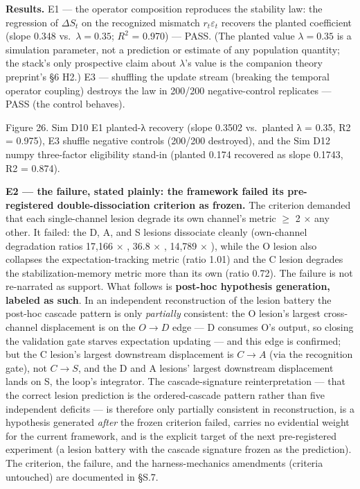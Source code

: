 \documentclass[
]{article}
\begin{document}
\textbf{Results.} E1 --- the operator composition reproduces the
stability law: the regression of \(\Delta S_t\) on the recognized
mismatch \(r_t\varepsilon_t\) recovers the planted coefficient (slope
0.348 vs.~\(\lambda = 0.35\); \(R^{2}\) = 0.970) --- PASS. (The planted
value \(\lambda = 0.35\) is a simulation parameter, not a prediction or
estimate of any population quantity; the stack's only prospective claim
about \(\lambda\)'s value is the companion theory preprint's §6 H2.) E3
--- shuffling the update stream (breaking the temporal operator
coupling) destroys the law in 200/200 negative-control replicates ---
PASS (the control behaves).

Figure 26. Sim D10 E1 planted-{λ} recovery (slope 0.3502 vs.~planted
{λ = 0.35}, {R2 = 0.975}), E3 shuffle negative controls (200/200
destroyed), and the Sim D12 numpy three-factor eligibility stand-in
(planted 0.174 recovered as slope 0.1743, {R2 = 0.874}).

\textbf{E2 --- the failure, stated plainly: the framework failed its
pre-registered double-dissociation criterion as frozen.} The criterion
demanded that each single-channel lesion degrade its own channel's
metric \(\geq\) 2 \(\times\) any other. It failed: the D, A, and S
lesions dissociate cleanly (own-channel degradation ratios 17,166
\(\times\) , 36.8 \(\times\) , 14,789 \(\times\) ), while the O lesion
also collapses the expectation-tracking metric (ratio 1.01) and the C
lesion degrades the stabilization-memory metric more than its own (ratio
0.72). The failure is not re-narrated as support. What follows is
\textbf{post-hoc hypothesis generation, labeled as such}. In an
independent reconstruction of the lesion battery the post-hoc cascade
pattern is only \emph{partially} consistent: the O lesion's largest
cross-channel displacement is on the \(O{\to}D\) edge --- D consumes O's
output, so closing the validation gate starves expectation updating ---
and this edge is confirmed; but the C lesion's largest downstream
displacement is \(C{\to}A\) (via the recognition gate), not \(C{\to}S\),
and the D and A lesions' largest downstream displacement lands on S, the
loop's integrator. The cascade-signature reinterpretation --- that the
correct lesion prediction is the ordered-cascade pattern rather than
five independent deficits --- is therefore only partially consistent in
reconstruction, is a hypothesis generated \emph{after} the frozen
criterion failed, carries no evidential weight for the current
framework, and is the explicit target of the next pre-registered
experiment (a lesion battery with the cascade signature frozen as the
prediction). The criterion, the failure, and the harness-mechanics
amendments (criteria untouched) are documented in §S.7.
\end{document}
